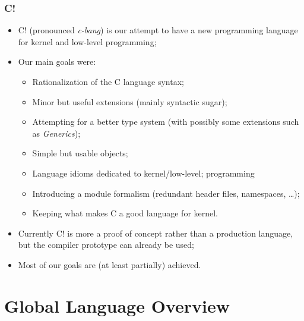 \documentclass[pdftex]{beamer}
\begin{document}
\begin{frame}
  \frametitle{C!}
  \begin{itemize}
  \item {C!} (pronounced \emph{c-bang}) is our attempt to have a new
    programming language for kernel and low-level programming;
  \item Our main goals were:
    \begin{itemize}
    \item Rationalization of the C language syntax;
    \item Minor but useful extensions (mainly syntactic sugar);
    \item Attempting for a better type system (with possibly some
      extensions such as \emph{Generics});
    \item Simple but usable objects;
    \item Language idioms dedicated to kernel/low-level;
      programming
    \item Introducing a module formalism (redundant header files, namespaces, \ldots);
    \item Keeping what makes C a good language for kernel.
    \end{itemize}
  \item Currently C! is more a proof of concept rather than a production
    language, but the compiler prototype can already be used;
  \item Most of our goals are (at least partially) achieved.
  \end{itemize}
\end{frame}



\section{Global Language Overview}
\end{document}
